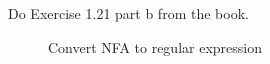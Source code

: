 \begin{problem}{2}
  Do Exercise 1.21 part b from the book.

  \begin{solution}
    \begin{figure}[H]
      \centering
      \caption{Convert NFA to regular expression}
\end{figure}
\end{solution}
\end{problem}
